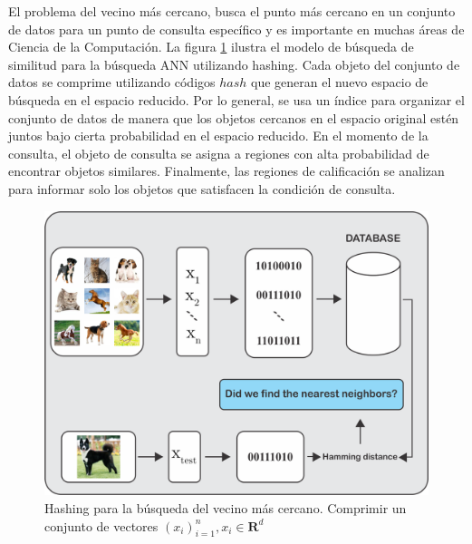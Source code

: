 El problema del vecino más cercano, busca el punto más cercano en un conjunto de datos para un punto de consulta específico y es importante en muchas áreas de Ciencia de la Computación. La figura \ref{searchmodelcap5} ilustra el modelo de búsqueda de similitud para la búsqueda ANN utilizando hashing. Cada objeto del conjunto de datos se comprime utilizando códigos $hash$ que generan el nuevo espacio de búsqueda en el espacio reducido. Por lo general, se usa un índice para organizar el conjunto de datos de manera que los objetos cercanos en el espacio original estén juntos bajo cierta probabilidad en el espacio reducido. En el momento de la consulta, el objeto de consulta se asigna a regiones con alta probabilidad de encontrar objetos similares. Finalmente, las regiones de calificación se analizan para informar solo los objetos que satisfacen la condición de consulta.
\begin{figure}[htp]
\includegraphics[width=0.7\columnwidth]{chapter5/ima1.png}
\centering
\caption{ Hashing para la búsqueda del vecino más cercano. Comprimir un conjunto de vectores  $(x_i)^{n}_{i=1}, x_i \in \mathbf{R}^d $ }
\label{searchmodelcap5}
\end{figure}

